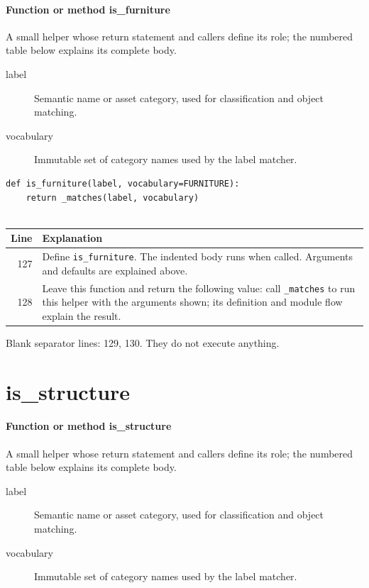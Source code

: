 \documentclass[11pt,a4paper]{book}
\begin{document}
\paragraph{Function or method is\_furniture}
A small helper whose return statement and callers define its role; the numbered table below explains its complete body.

\begin{description}
\item[label] Semantic name or asset category, used for classification and object matching.
\item[vocabulary] Immutable set of category names used by the label matcher.
\end{description}

\begin{lstlisting}[firstnumber=127]
def is_furniture(label, vocabulary=FURNITURE):
    return _matches(label, vocabulary)


\end{lstlisting}

\begin{longtable}{r p{}}

\textbf{Line} & \textbf{Explanation} \\ \hline \endhead

127 & Define \texttt{is\_furniture}. The indented body runs when called. Arguments and defaults are explained above. \\

128 & Leave this function and return the following value: call \texttt{\_matches} to run this helper with the arguments shown; its definition and module flow explain the result. \\

\end{longtable}

Blank separator lines: 129, 130. They do not execute anything.

\section{is\_structure}

\paragraph{Function or method is\_structure}
A small helper whose return statement and callers define its role; the numbered table below explains its complete body.

\begin{description}
\item[label] Semantic name or asset category, used for classification and object matching.
\item[vocabulary] Immutable set of category names used by the label matcher.
\end{description}
\end{document}

